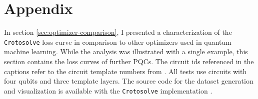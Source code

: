 \chapter{Appendix}
\label{chap:appendix}

In section \ref{sec:optimizer-comparison}, I presented a characterization of
the \texttt{Crotosolve} loss curve in comparison to other optimizers used in
quantum machine learning.
While the analysis was illustrated with a single example, this section contains
the loss curves of further PQCs.
The circuit ids referenced in the captions refer to the circuit template numbers
from \cite{sim_expressibility_2019}.
All tests use circuits with four qubits and three template layers.
The source code for the dataset generation and visualization is available with
the \texttt{Crotosolve} implementation \cite{crotosolve}.

